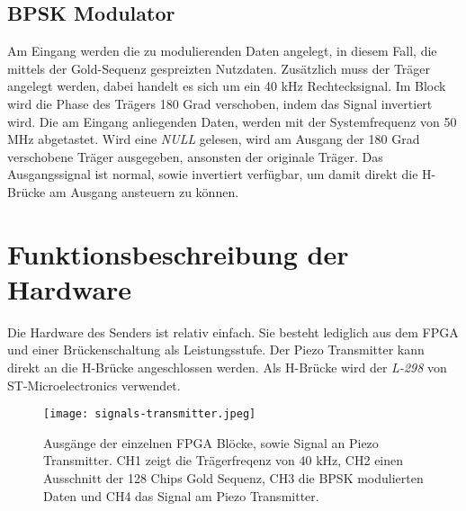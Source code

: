 \subsection{BPSK Modulator}
Am Eingang werden die zu modulierenden Daten angelegt, in diesem Fall, die mittels der Gold-Sequenz gespreizten Nutzdaten. Zusätzlich muss der Träger angelegt werden, dabei handelt es sich um ein 40 kHz Rechtecksignal. Im Block wird die Phase des Trägers 180 Grad verschoben, indem das Signal invertiert wird. Die am Eingang anliegenden Daten, werden mit der Systemfrequenz von 50 MHz abgetastet. Wird eine \emph{NULL} gelesen, wird am Ausgang der 180 Grad verschobene Träger ausgegeben, ansonsten der originale Träger. Das Ausgangssignal ist normal, sowie invertiert verfügbar, um damit direkt die H-Brücke am Ausgang ansteuern zu können.

\section{Funktionsbeschreibung der Hardware}
Die Hardware des Senders ist relativ einfach. Sie besteht lediglich aus dem FPGA und einer Brückenschaltung als Leistungsstufe. Der Piezo Transmitter kann direkt an die H-Brücke angeschlossen werden. Als H-Brücke wird der \emph{L-298} von ST-Microelectronics verwendet.

\begin{figure}[H]
\centering
\texttt{[image: signals-transmitter.jpeg]}
\caption{Ausgänge der einzelnen FPGA Blöcke, sowie Signal an Piezo Transmitter. CH1 zeigt die Trägerfreqenz von 40 kHz, CH2 einen Ausschnitt der 128 Chips Gold Sequenz, CH3 die BPSK modulierten Daten und CH4 das Signal am Piezo Transmitter.}
\label{fig:transmitterSignals}
\end{figure}